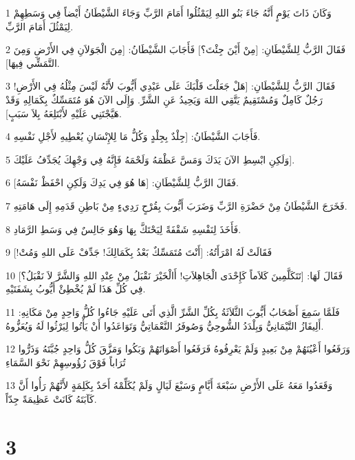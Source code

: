 \par 1 وَكَانَ ذَاتَ يَوْمٍ أَنَّهُ جَاءَ بَنُو اللهِ لِيَمْثُلُوا أَمَامَ الرَّبِّ وَجَاءَ الشَّيْطَانُ أَيْضاً فِي وَسَطِهِمْ لِيَمْثُلَ أَمَامَ الرَّبِّ.
\par 2 فَقَالَ الرَّبُّ لِلشَّيْطَانِ: [مِنْ أَيْنَ جِئْتَ؟] فَأَجَابَ الشَّيْطَانُ: [مِنَ الْجَوَلاَنِ فِي الأَرْضِ وَمِنَ التَّمَشِّي فِيهَا].
\par 3 فَقَالَ الرَّبُّ لِلشَّيْطَانِ: [هَلْ جَعَلْتَ قَلْبَكَ عَلَى عَبْدِي أَيُّوبَ لأَنَّهُ لَيْسَ مِثْلُهُ فِي الأَرْضِ! رَجُلٌ كَامِلٌ وَمُسْتَقِيمٌ يَتَّقِي اللهَ وَيَحِيدُ عَنِ الشَّرِّ. وَإِلَى الآنَ هُوَ مُتَمَسِّكٌ بِكَمَالِهِ وَقَدْ هَيَّجْتَنِي عَلَيْهِ لأَبْتَلِعَهُ بِلاَ سَبَبٍ].
\par 4 فَأَجَابَ الشَّيْطَانُ: [جِلْدٌ بِجِلْدٍ وَكُلُّ مَا لِلإِنْسَانِ يُعْطِيهِ لأَجْلِ نَفْسِهِ.
\par 5 وَلَكِنِ ابْسِطِ الآنَ يَدَكَ وَمَسَّ عَظْمَهُ وَلَحْمَهُ فَإِنَّهُ فِي وَجْهِكَ يُجَدِّفُ عَلَيْكَ].
\par 6 فَقَالَ الرَّبُّ لِلشَّيْطَانِ: [هَا هُوَ فِي يَدِكَ وَلَكِنِ احْفَظْ نَفْسَهُ].
\par 7 فَخَرَجَ الشَّيْطَانُ مِنْ حَضْرَةِ الرَّبِّ وَضَرَبَ أَيُّوبَ بِقُرْحٍ رَدِيءٍ مِنْ بَاطِنِ قَدَمِهِ إِلَى هَامَتِهِ.
\par 8 فَأَخَذَ لِنَفْسِهِ شَقْفَةً لِيَحْتَكَّ بِهَا وَهُوَ جَالِسٌ فِي وَسَطِ الرَّمَادِ.
\par 9 فَقَالَتْ لَهُ امْرَأَتُهُ: [أَنْتَ مُتَمَسِّكٌ بَعْدُ بِكَمَالِكَ! جَدِّفْ عَلَى اللهِ وَمُتْ!]
\par 10 فَقَالَ لَهَا: [تَتَكَلَّمِينَ كَلاَماً كَإِحْدَى الْجَاهِلاَتِ! أَالْخَيْرَ نَقْبَلُ مِنْ عِنْدِ اللهِ وَالشَّرَّ لاَ نَقْبَلُ؟] فِي كُلِّ هَذَا لَمْ يُخْطِئْ أَيُّوبُ بِشَفَتَيْهِ.
\par 11 فَلَمَّا سَمِعَ أَصْحَابُ أَيُّوبَ الثَّلاَثَةُ بِكُلِّ الشَّرِّ الَّذِي أَتَى عَلَيْهِ جَاءُوا كُلُّ وَاحِدٍ مِنْ مَكَانِهِ: أَلِيفَازُ التَّيْمَانِيُّ وَبِلْدَدُ الشُّوحِيُّ وَصُوفَرُ النَّعْمَاتِيُّ وَتَوَاعَدُوا أَنْ يَأْتُوا لِيَرْثُوا لَهُ وَيُعَزُّوهُ.
\par 12 وَرَفَعُوا أَعْيُنَهُمْ مِنْ بَعِيدٍ وَلَمْ يَعْرِفُوهُ فَرَفَعُوا أَصْوَاتَهُمْ وَبَكُوا وَمَزَّقَ كُلُّ وَاحِدٍ جُبَّتَهُ وَذَرُّوا تُرَاباً فَوْقَ رُؤُوسِهِمْ نَحْوَ السَّمَاءِ
\par 13 وَقَعَدُوا مَعَهُ عَلَى الأَرْضِ سَبْعَةَ أَيَّامٍ وَسَبْعَ لَيَالٍ وَلَمْ يُكَلِّمْهُ أَحَدٌ بِكَلِمَةٍ لأَنَّهُمْ رَأُوا أَنَّ كَآبَتَهُ كَانَتْ عَظِيمَةً جِدّاً.

\chapter{3}

